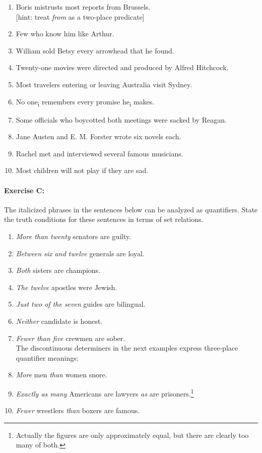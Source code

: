 {\begin{enumerate}
\item Boris mistrusts most reports from Brussels.\\
{}[hint: treat \textit{from} as a two-place predicate]
\item Few who know him like Arthur.
\item William sold Betsy every arrowhead that he found.
\item Twenty-one movies were directed and produced by Alfred Hitchcock.
\item Most travelers entering or leaving Australia visit Sydney.
\item No one\textsubscript{i} remembers every promise he\textsubscript{i} makes.
\item Some officials who boycotted both meetings were sacked by Reagan.
\item Jane Austen and E. M. Forster wrote six novels each.
\item Rachel met and interviewed several famous musicians.
\item Most children will not play if they are sad.
\end{enumerate}

\paragraph*{Exercise C:} The italicized phrases in the sentences below can be analyzed as quantifiers. State the truth conditions for these sentences in terms of set relations. 


\begin{enumerate}
\item \textit{More than twenty}  senators are guilty.   


\item \textit{Between six and twelve} generals are loyal.
\item \textit{Both} sisters are champions.
\item \textit{The twelve} apostles were Jewish.
\item \textit{Just two of the seven} guides are bilingual.
\item \textit{Neither} candidate is honest.
\item \textit{Fewer than five} crewmen are sober. \\

The discontinuous determiners in the next examples express three-place quantifier meanings:

\item \textit{More} men \textit{than} women snore.
\item \textit{Exactly as many} Americans are lawyers \textit{as} are prisoners.\footnote{Actually the figures are only approximately equal, but there are clearly too many of both.} 
\item \textit{Fewer} wrestlers \textit{than} boxers are famous. 
\end{enumerate}}
